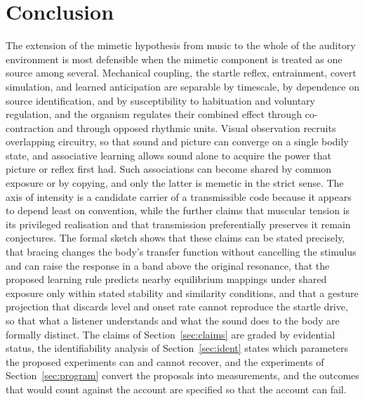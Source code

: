 \documentclass[11pt]{article}
\theoremstyle{plain}
\theoremstyle{definition}
\begin{document}
\section{Conclusion}\label{sec:conclusion}

The extension of the mimetic hypothesis from music to the whole of the auditory environment is most defensible when the mimetic component is treated as one source among several. Mechanical coupling, the startle reflex, entrainment, covert simulation, and learned anticipation are separable by timescale, by dependence on source identification, and by susceptibility to habituation and voluntary regulation, and the organism regulates their combined effect through co-contraction and through opposed rhythmic units. Visual observation recruits overlapping circuitry, so that sound and picture can converge on a single bodily state, and associative learning allows sound alone to acquire the power that picture or reflex first had. Such associations can become shared by common exposure or by copying, and only the latter is memetic in the strict sense. The axis of intensity is a candidate carrier of a transmissible code because it appears to depend least on convention, while the further claims that muscular tension is its privileged realisation and that transmission preferentially preserves it remain conjectures. The formal sketch shows that these claims can be stated precisely, that bracing changes the body's transfer function without cancelling the stimulus and can raise the response in a band above the original resonance, that the proposed learning rule predicts nearby equilibrium mappings under shared exposure only within stated stability and similarity conditions, and that a gesture projection that discards level and onset rate cannot reproduce the startle drive, so that what a listener understands and what the sound does to the body are formally distinct. The claims of Section~\ref{sec:claims} are graded by evidential status, the identifiability analysis of Section~\ref{sec:ident} states which parameters the proposed experiments can and cannot recover, and the experiments of Section~\ref{sec:program} convert the proposals into measurements, and the outcomes that would count against the account are specified so that the account can fail.
\end{document}

